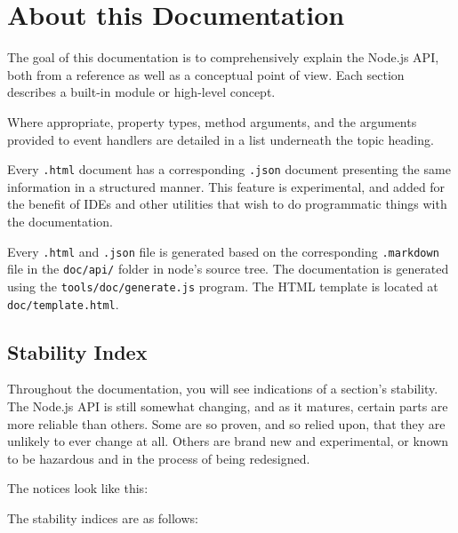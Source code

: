 \section{About this Documentation}

The goal of this documentation is to comprehensively explain the Node.js
API, both from a reference as well as a conceptual point of view. Each
section describes a built-in module or high-level concept.

Where appropriate, property types, method arguments, and the arguments
provided to event handlers are detailed in a list underneath the topic
heading.

Every \texttt{.html} document has a corresponding \texttt{.json}
document presenting the same information in a structured manner. This
feature is experimental, and added for the benefit of IDEs and other
utilities that wish to do programmatic things with the documentation.

Every \texttt{.html} and \texttt{.json} file is generated based on the
corresponding \texttt{.markdown} file in the \texttt{doc/api/} folder in
node's source tree. The documentation is generated using the
\texttt{tools/doc/generate.js} program. The HTML template is located at
\texttt{doc/template.html}.

\subsection{Stability Index}

Throughout the documentation, you will see indications of a section's
stability. The Node.js API is still somewhat changing, and as it
matures, certain parts are more reliable than others. Some are so
proven, and so relied upon, that they are unlikely to ever change at
all. Others are brand new and experimental, or known to be hazardous and
in the process of being redesigned.

The notices look like this:

\begin{Shaded}
\begin{Highlighting}[]
\NormalTok{: } 
\end{Highlighting}
\end{Shaded}

The stability indices are as follows:

